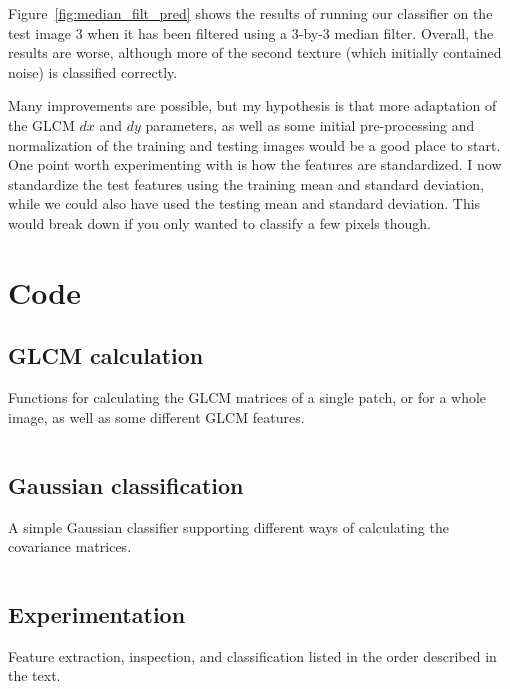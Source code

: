 \documentclass[a4paper]{article}
\begin{document}
Figure~\ref{fig:median_filt_pred} shows the results of running our
classifier on the test image 3 when it has been filtered using a 3-by-3
median filter. Overall, the results are worse, although more of the
second texture (which initially contained noise) is classified
correctly.

Many improvements are possible, but my hypothesis is that more
adaptation of the GLCM $dx$ and $dy$ parameters, as well as some initial
pre-processing and normalization of the training and testing images
would be a good place to start. One point worth experimenting with is
how the features are standardized. I now standardize the test features
using the training mean and standard deviation, while we could also have
used the testing mean and standard deviation. This would break down if
you only wanted to classify a few pixels though.

\appendix

\section{Code}
\label{app:code}

\subsection{GLCM calculation}

Functions for calculating the GLCM matrices of a single patch, or for a
whole image, as well as some different GLCM features.

\inputminted[fontsize=\footnotesize]{python}{../glcm.py}

\subsection{Gaussian classification}

A simple Gaussian classifier supporting different ways of calculating
the covariance matrices.

\inputminted[fontsize=\footnotesize]{python}{../gaussian.py}

\subsection{Experimentation}

Feature extraction, inspection, and classification listed in the order
described in the text.

\inputminted[fontsize=\footnotesize]{python}{test.py}
\end{document}
